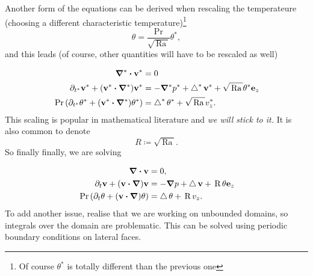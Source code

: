 \documentclass[reqno, a4paper]{article}
\begin{document}
Another form of the equations can be derived when rescaling the temperateure (choosing a different characteristic temperature)\footnote{Of course $\theta^{*}$ is totally different than the previous one}
\[
	\theta = \frac{\, \text{Pr} \,}{\sqrt{\, \text{Ra} \,}}\theta^{*},
\]
and this leads (of course, other quantities will have to be rescaled as well)

\begin{align*}
	 \grad^{*} \vdot \vb{v}^{*}&= 0 \\
	\partial_{t^{*}} \vb{v}^{*} + \qty(\vb{v}^{*} \vdot \grad^{*})\vb{v}^{*} &= - \grad^{*} p^{*} + \laplace^{*} \vb{v}^{*} + \sqrt{\, \text{Ra} \,}\theta^{*} \vb{e}_z \\
	\, \text{Pr} \,\qty(\partial_{t^{*}}\theta^{*} + \qty(\vb{v}^{*} \vdot \grad^{*})\theta^{*}) &= \laplace^{*} \theta^{*} + \sqrt{\, \text{Ra} \,}v^{*}_z.
\end{align*}
This scaling is popular in mathematical literature and \textit{we will stick to it.} It is also common to denote
\[
	R \coloneq \sqrt{\, \text{Ra} \,}.
\]
So finally finally, we are solving

\begin{align*}
	\divergence{\vb{v}}&= 0, \\
	\partial_t \vb{v}+ \qty(\vb{v} \vdot \grad)\vb{v} &= - \grad p + \laplace \vb{v} + \, \text{R} \, \theta \vb{e}_z \\
	\, \text{Pr} \,\qty(\partial_t \theta + \qty(\vb{v} \vdot \grad)\theta) & = \laplace \theta + \, \text{R} \,v_z.
\end{align*}
To add another issue, realise that we are working on unbounded domains, so integrals over the domain are problematic. This can be solved using periodic boundary conditions on lateral faces. 
\end{document}
